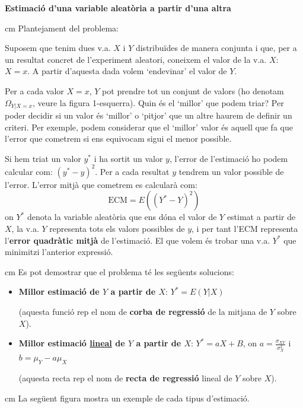 \documentclass{article}
\begin{document}
\noindent
\textbf{\large Estimaci\'o d'una variable aleat\`oria a partir d'una altra}

 cm
\noindent
Plantejament del problema:

Suposem que tenim dues v.a. $X$ i $Y$ distribu\"ides de manera conjunta
i que, per a un resultat concret de l'experiment aleatori, coneixem el
valor de la v.a. $X$: $X=x$. A partir d'aquesta dada volem `endevinar' 
el valor de $Y$.

Per a cada valor $X=x$, $Y$ pot prendre tot un conjunt de valors (ho denotam $\Omega_{Y|X=x}$,
veure la figura 1-esquerra). Quin \'es el `millor' que podem triar?
Per poder decidir si un valor \'es `millor' o `pitjor' que un altre haurem de definir
un criteri. Per exemple, podem considerar que el `millor' valor \'es aquell que fa que
l'error que cometrem si ens equivocam sigui el menor possible.

Si hem triat un valor $y^*$ i ha sortit un valor $y$, l'error de l'estimaci\'o ho 
podem calcular com: $(y^* - y)^2$. Per a cada resultat $y$ tendrem un valor possible 
de l'error. L'error mitj\`a que cometrem es calcular\`a com:
\[
\mathrm{ECM}=E((Y^* - Y)^2)
\]
\noindent
on $Y^*$ denota la variable aleat\`oria que ens d\'ona el valor de $Y$ estimat a partir de $X$,
la v.a. $Y$ representa tots els valors possibles de $y$, i per tant l'ECM representa 
l'\textbf{error quadr\`atic mitj\`a} de l'estimaci\'o. El que volem \'es trobar una v.a. $Y^*$
que minimitzi l'anterior expressi\'o.

 cm
\noindent
Es pot demostrar que el problema t\'e les seg\"uents solucions:
\begin{itemize}
\item \textbf{Millor estimaci\'o de $Y$ a partir de $X$}: $Y^*=E(Y|X)$

(aquesta funci\'o rep el nom de \textbf{corba de regressi\'o} de la mitjana de $Y$ sobre $X$).

\item \textbf{Millor estimaci\'o \underline{lineal} de $Y$ a partir de $X$}: 
$Y^*=aX+B$, on $a=\frac{\sigma_{XY}}{\sigma_X^2}$ i $b=\mu_Y - a \mu_X$

(aquesta recta rep el nom de \textbf{recta de regressi\'o} lineal de $Y$ sobre $X$).

\end{itemize}

 cm
\noindent
La seg\"uent figura mostra un exemple de cada tipus d'estimaci\'o.
\end{document}
